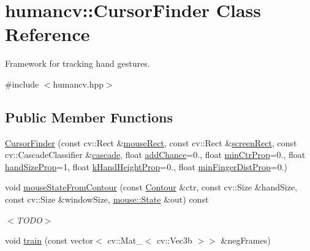 \hypertarget{classhumancv_1_1_cursor_finder}{\section{humancv\-:\-:Cursor\-Finder Class Reference}
\label{classhumancv_1_1_cursor_finder}
}


Framework for tracking hand gestures.  




{\ttfamily \#include $<$humancv.\-hpp$>$}

\subsection*{Public Member Functions}
\begin{DoxyCompactItemize}
\item 
\hyperlink{classhumancv_1_1_cursor_finder_a3ff8b8961e65f437484cc61bfb28dee1}{Cursor\-Finder} (const cv\-::\-Rect \&\hyperlink{classhumancv_1_1_cursor_finder_ac24299e06cd5d271dac727a80bebc5c3}{mouse\-Rect}, const cv\-::\-Rect \&\hyperlink{classhumancv_1_1_cursor_finder_a8a6474e4cf616789f7b14085e83261c8}{screen\-Rect}, const cv\-::\-Cascade\-Classifier \&\hyperlink{classhumancv_1_1_cursor_finder_a5dd2e09ff9ca7e0667d0267d571a31ff}{cascade}, float \hyperlink{classhumancv_1_1_cursor_finder_ad7607c9dd807d16db9cda9cea42e8dcb}{add\-Chance}=0., float \hyperlink{classhumancv_1_1_cursor_finder_aefec5ff071032bfce5d46c4cdedf3f10}{min\-Ctr\-Prop}=0., float \hyperlink{classhumancv_1_1_cursor_finder_a647e0325a998393648793c069524454d}{hand\-Size\-Prop}=1, float \hyperlink{classhumancv_1_1_cursor_finder_a816167296fd52528605710cccd3336b8}{k\-Hand\-Height\-Prop}=0., float \hyperlink{classhumancv_1_1_cursor_finder_a8703da65435e5707559fe59180634b40}{min\-Finger\-Dist\-Prop}=0.)
\item 
void \hyperlink{classhumancv_1_1_cursor_finder_af2069456a8a2ec608e5d5cdd109d5396}{mouse\-State\-From\-Contour} (const \hyperlink{namespacehumancv_ac3621cda88df26d2718f6bd5ec4de1dd}{Contour} \&ctr, const cv\-::\-Size \&hand\-Size, const cv\-::\-Size \&window\-Size, \hyperlink{structmouse_1_1_state}{mouse\-::\-State} \&out) const 
\begin{DoxyCompactList}\small\item\em $<$\-T\-O\-D\-O$>$ \end{DoxyCompactList}\item 
void \hyperlink{classhumancv_1_1_cursor_finder_a2767654c55943ef9d7e516a9f08dcb8a}{train} (const vector$<$ cv\-::\-Mat\-\_\-$<$ cv\-::\-Vec3b $>$$>$ \&neg\-Frames)
$$
\end{DoxyCompactItemize}
